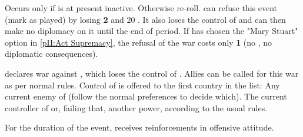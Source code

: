 




\condition{}
\aparag Occurs only if \paysecosse is at present inactive. Otherwise re-roll.
\aparag \ENG can refuse this event (mark as played) by losing {\bf 2} \STAB
and 20 \VP. It also loses the control of \paysecosse and can then make no
diplomacy on it until the end of period.
\bparag If \ANG has chosen the "Mary Stuart" option in \ref{pII:Act
  Supremacy}, the refusal of the war costs only {\bf 1} \STAB (no \VP, no
diplomatic consequences).

\phevnt
\aparag \paysecosse declares war against \ENG, which loses the control of
\paysecosse.
\aparag Allies can be called for this war as per normal rules.
\aparag Control of \paysecosse is offered to the first country in the list:
\bparag Any current enemy of \ENG (follow the normal preferences to decide
which).
\bparag The current controller of \paysecosse or, failing that, another power,
according to the usual rules.

\phadm
\aparag For the duration of the event, \paysecosse receives reinforcements in
offensive attitude.




